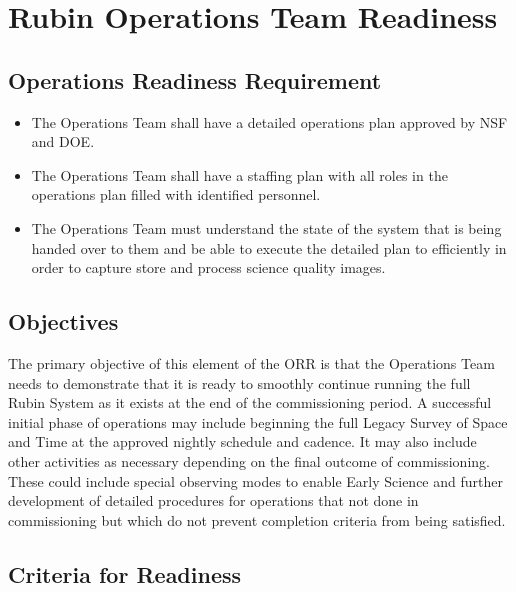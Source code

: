 \section{Rubin Operations Team Readiness} \label{sec:ops}

\subsection{Operations Readiness Requirement}

\begin{itemize}

	\item The Operations Team shall have a detailed operations plan approved by NSF and DOE.
	\item The Operations Team shall have a staffing plan with all roles in the operations plan filled with identified personnel. 
	\item The Operations Team must understand the state of the system that is being handed over to them and be able to execute the detailed plan to efficiently in order to capture store and process science quality images.
	
\end{itemize}

\subsection{Objectives}

The primary objective of this element of the ORR is that the Operations Team needs to demonstrate that it is ready to smoothly continue running the full Rubin System as it exists at the end of the commissioning period. A successful initial phase of operations may include beginning the full Legacy Survey of Space and Time at the approved nightly schedule and cadence. It may also include other activities as necessary depending on the final outcome of commissioning. These could include special observing modes to enable Early Science and further development of detailed procedures for operations that not done in commissioning but which do not prevent completion criteria from being satisfied.  

\subsection{Criteria for Readiness}

